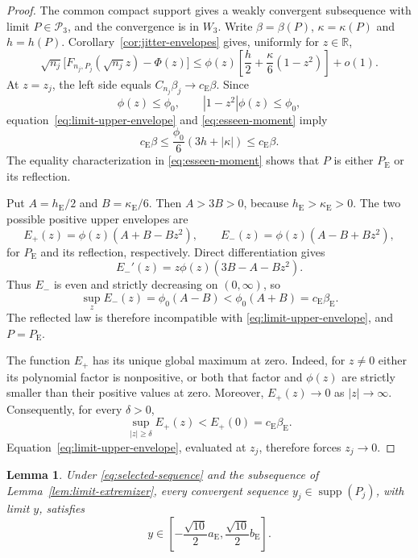 \documentclass[aop]{imsart}
\theoremstyle{plain}
\newtheorem{lemma}[theorem]{Lemma}
\theoremstyle{definition}
\theoremstyle{definition}
\newcommand{\R}{\mathbb R}
\newcommand{\Pthree}{\mathcal P_3}
\newcommand{\ce}{c_{\mathrm E}}
\newcommand{\be}{\beta_{\mathrm E}}
\newcommand{\ke}{\kappa_{\mathrm E}}
\newcommand{\Pe}{P_{\mathrm E}}
\newcommand{\aE}{a_{\mathrm E}}
\newcommand{\bE}{b_{\mathrm E}}
\DeclareMathOperator{\supp}{supp}
\begin{document}
\begin{proof}
The common compact support gives a weakly convergent subsequence with limit \(P\in\Pthree\), and the convergence is in \(W_3\). Write \(\beta=\beta(P)\), \(\kappa=\kappa(P)\) and \(h=h(P)\). Corollary~\ref{cor:jitter-envelopes} gives, uniformly for \(z\in\R\),
\begin{equation}\label{eq:limit-upper-envelope}
 \sqrt{n_j}\bigl[F_{n_j,P_j}(\sqrt{n_j}z)-\Phi(z)\bigr]
 \le \phi(z)\left[\frac h2+\frac\kappa6(1-z^2)\right]+o(1).
\end{equation}
At \(z=z_j\), the left side equals \(C_{n_j}\beta_j\to\ce\beta\). Since
\[
 \phi(z)\le\phi_0,\qquad
 |1-z^2|\phi(z)\le\phi_0,
\]
equation~\eqref{eq:limit-upper-envelope} and \eqref{eq:esseen-moment} imply
\[
 \ce\beta\le\frac{\phi_0}{6}(3h+|\kappa|)\le\ce\beta.
\]
The equality characterization in \eqref{eq:esseen-moment} shows that \(P\) is either \(\Pe\) or its reflection.

Put $A=h_{\mathrm E}/2$ and $B=\ke/6$. Then $A>3B>0$,
because $h_{\mathrm E}>\ke>0$. The two possible positive
upper envelopes are
\[
 E_+(z)=\phi(z)(A+B-Bz^2),\qquad
 E_-(z)=\phi(z)(A-B+Bz^2),
\]
for $\Pe$ and its reflection, respectively. Direct differentiation gives
\[
 E_-'(z)=z\phi(z)(3B-A-Bz^2).
\]
Thus $E_-$ is even and strictly decreasing on $(0,\infty)$, so
\[
 \sup_z E_-(z)=\phi_0(A-B)
 <\phi_0(A+B)=\ce\be.
\]
The reflected law is therefore incompatible with
\eqref{eq:limit-upper-envelope}, and $P=\Pe$.

The function $E_+$ has its unique global maximum at zero.
Indeed, for $z\ne0$ either its polynomial factor is nonpositive,
or both that factor and $\phi(z)$ are strictly smaller than their
positive values at zero. Moreover, $E_+(z)\to0$ as $|z|\to\infty$.
Consequently, for every $\delta>0$,
\[
 \sup_{|z|\ge\delta}E_+(z)<E_+(0)=\ce\be.
\]
Equation~\eqref{eq:limit-upper-envelope}, evaluated at $z_j$,
therefore forces $z_j\to0$.
\end{proof}

\begin{lemma}\label{lem:support-interval}
Under \eqref{eq:selected-sequence} and the subsequence of Lemma~\ref{lem:limit-extremizer}, every convergent sequence \(y_j\in\supp(P_j)\), with limit \(y\), satisfies
\begin{equation}\label{eq:limiting-support-interval}
 y\in\left[-\frac{\sqrt{10}}2\aE,
                \frac{\sqrt{10}}2\bE\right].
\end{equation}
\end{lemma}
\end{document}
